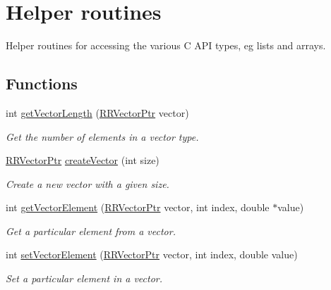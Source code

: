 \hypertarget{group__helper_routines}{\section{Helper routines}
\label{group__helper_routines}
}


Helper routines for accessing the various C A\+P\+I types, eg lists and arrays.  


\subsection*{Functions}
\begin{DoxyCompactItemize}
\item 
int \hyperlink{group__helper_routines_ga36649ac03ad15ad8242f03ff9d28b0a9}{get\+Vector\+Length} (\hyperlink{rrc__types_8h_a3be72d6006034fd349f753d2bf441bf7}{R\+R\+Vector\+Ptr} vector)
\begin{DoxyCompactList}\small\item\em Get the number of elements in a vector type. \end{DoxyCompactList}\item 
\hyperlink{rrc__types_8h_a3be72d6006034fd349f753d2bf441bf7}{R\+R\+Vector\+Ptr} \hyperlink{group__helper_routines_gac903628f96b1bf2308fa4a79b189cc1c}{create\+Vector} (int size)
\begin{DoxyCompactList}\small\item\em Create a new vector with a given size. \end{DoxyCompactList}\item 
int \hyperlink{group__helper_routines_ga50bd3404f659a3c2bfa9c18dfbf170d4}{get\+Vector\+Element} (\hyperlink{rrc__types_8h_a3be72d6006034fd349f753d2bf441bf7}{R\+R\+Vector\+Ptr} vector, int index, double $\ast$value)
\begin{DoxyCompactList}\small\item\em Get a particular element from a vector. \end{DoxyCompactList}\item 
int \hyperlink{group__helper_routines_gab5419bd3ffa3e2b8d7b6ee3afaf8477e}{set\+Vector\+Element} (\hyperlink{rrc__types_8h_a3be72d6006034fd349f753d2bf441bf7}{R\+R\+Vector\+Ptr} vector, int index, double value)
\begin{DoxyCompactList}\small\item\em Set a particular element in a vector. \end{DoxyCompactList}\item 

\end{DoxyCompactItemize}
